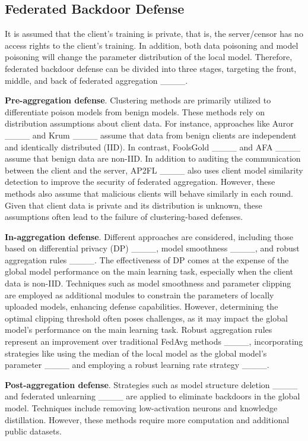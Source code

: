 \subsection{Federated Backdoor Defense}\label{Sec2.3}

It is assumed that the client's training is private, that is, the server/censor has no access rights to the client's training. In addition, both data poisoning and model poisoning will change the parameter distribution of the local model. Therefore, federated backdoor defense can be divided into three stages, targeting the front, middle, and back of federated aggregation ____.

\textbf{Pre-aggregation defense}. Clustering methods are primarily utilized to differentiate poison models from benign models. These methods rely on distribution assumptions about client data. For instance, approaches like Auror ____ and Krum ____ assume that data from benign clients are independent and identically distributed (IID). In contrast, FoolsGold ____ and AFA ____ assume that benign data are non-IID. In addition to auditing the communication between the client and the server, AP2FL ____ also uses client model similarity detection to improve the security of federated aggregation. However, these methods also assume that malicious clients will behave similarly in each round. Given that client data is private and its distribution is unknown, these assumptions often lead to the failure of clustering-based defenses.

\textbf{In-aggregation defense}. Different approaches are considered, including those based on differential privacy (DP) ____, model smoothness ____, and robust aggregation rules ____. The effectiveness of DP comes at the expense of the global model performance on the main learning task, especially when the client data is non-IID. Techniques such as model smoothness and parameter clipping are employed as additional modules to constrain the parameters of locally uploaded models, enhancing defense capabilities. However, determining the optimal clipping threshold often poses challenges, as it may impact the global model's performance on the main learning task. Robust aggregation rules represent an improvement over traditional FedAvg methods ____, incorporating strategies like using the median of the local model as the global model's parameter ____ and employing a robust learning rate strategy ____.

\textbf{Post-aggregation defense}. Strategies such as model structure deletion ____ and federated unlearning ____ are applied to eliminate backdoors in the global model. Techniques include removing low-activation neurons and knowledge distillation. However, these methods require more computation and additional public datasets.